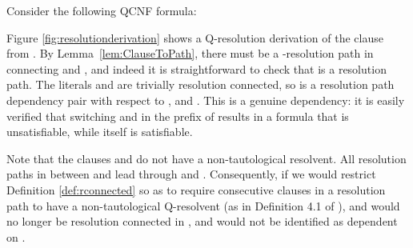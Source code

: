 \documentclass{llncs}
\newcommand{\longversion}[1]{#1}
\newcommand{\shortversion}[1]{}
\def\hy{\hbox{-}\nobreak\hskip0pt} \newcommand{\ellipsis}{}
\begin{document}
\begin{example}\label{ex:nontaut} \longversion{Consider the following QCNF formula:
  }
\shortversion{Let , where
  , , , , and .}
 Figure \ref{fig:resolutionderivation} shows a Q\hy resolution
derivation of the clause  from . By
Lemma~\ref{lem:ClauseToPath}, there must be a -resolution path in
 connecting  and , and indeed it is straightforward to check that
 is a resolution
path. The literals  and  are trivially resolution connected,
so  is a resolution path dependency pair with respect to ,
and . This is a genuine dependency: it is easily
verified that switching  and  in the prefix of 
results in a formula that is unsatisfiable, while  itself is
satisfiable.

  Note that the clauses  and  do not have a non\hy tautological
  resolvent. All resolution paths in  between  and  lead through
   and . Consequently, if we would restrict Definition
  \ref{def:rconnected} so as to require consecutive clauses in a resolution
  path to have a non\hy tautological Q\hy resolvent (as in Definition 4.1 of
  \cite{VanGelder11}),  and  would no longer be resolution connected in
  , and  would not be identified as dependent on .
\end{example}
\end{document}
